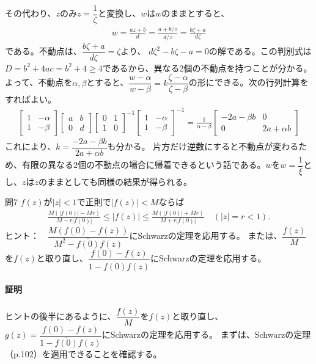 その代わり、$z$のみ$z=\dfrac{1}{\zeta}$と変換し、$w$は$w$のままとすると、
\begin{align*}
    w=\frac{az+b}{d}=\frac{a+b/z}{d/z}=\frac{b\zeta+a}{d\zeta}
\end{align*}
である。不動点は、$\dfrac{b\zeta+a}{d\zeta}=\zeta$より、
$d\zeta^2-b\zeta-a=0$の解である。この判別式は$D=b^2+4ac=b^2+4\ge4$であるから、異なる2個の不動点を持つことが分かる。よって、不動点を$\alpha,\beta$とすると、$\dfrac{w-\alpha}{w-\beta}=k\dfrac{\zeta-\alpha}{\zeta-\beta}$の形にできる。次の行列計算をすればよい。
\begin{align*}
    \begin{bmatrix}
        1&-\alpha\\1&-\beta
    \end{bmatrix}
    \begin{bmatrix}
        a&b\\0&d
    \end{bmatrix}
    \begin{bmatrix}
        0&1\\1&0
    \end{bmatrix}^{-1}
    \begin{bmatrix}
        1&-\alpha\\1&-\beta
    \end{bmatrix}^{-1}
    =\frac{1}{\alpha-\beta}
    \begin{bmatrix}
        -2a-\beta b&0\\0&2a+\alpha b
    \end{bmatrix}
\end{align*}
これにより、$k=\dfrac{-2a-\beta b}{2a+\alpha b}$も分かる。
片方だけ逆数にすると不動点が変わるため、有限の異なる2個の不動点の場合に帰着できるという話である。$w$を$w=\dfrac{1}{\xi}$とし、$z$は$z$のままとしても同様の結果が得られる。

\newpage
\begin{mysimplebox}{問7}
    $f(z)$が$|z|<1$で正則で$|f(z)|<M$ならば
    \begin{align*}
        \frac{M(|f(0)|-Mr)}{M-r|f(0)|}
        \le|f(z)|
        \le\frac{M(|f(0)|+Mr)}{M+r|f(0)|}
        \quad(|z|=r<1).
    \end{align*}
    ヒント：　$\dfrac{M(f(0)-f(z))}{M^2-\overline{f(0)}f(z)}$にSchwarzの定理を応用する。
    または、$\dfrac{f(z)}{M}$を$f(z)$と取り直し、$\dfrac{f(0)-f(z)}{1-\overline{f(0)}f(z)}$にSchwarzの定理を応用する。
\end{mysimplebox}
\paragraph{証明}
ヒントの後半にあるように、$\dfrac{f(z)}{M}$を$f(z)$と取り直し、$g(z)=\dfrac{f(0)-f(z)}{1-\overline{f(0)}f(z)}$にSchwarzの定理を応用する。
まずは、Schwarzの定理（p.102）を適用できることを確認する。

